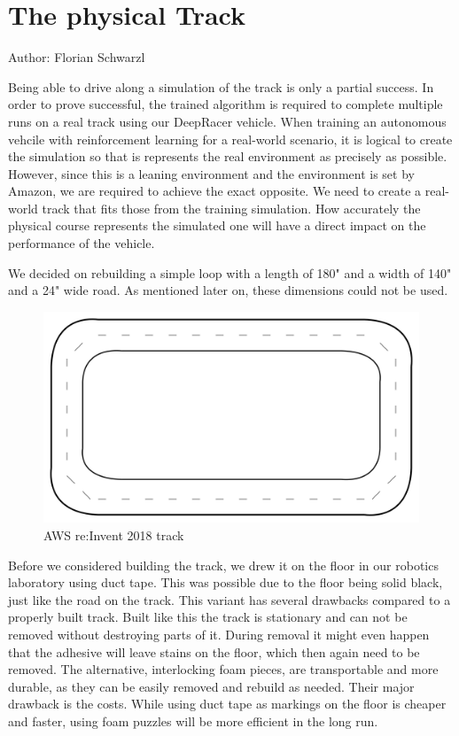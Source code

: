 \chapter{The physical Track}
Author: Florian Schwarzl

Being able to drive along a simulation of the track is only a partial success. In order to prove successful, the trained algorithm is required to complete multiple runs on a real track using our DeepRacer vehicle. When training an autonomous vehcile with reinforcement learning for a real-world scenario, it is logical to create the simulation so that is represents the real environment as precisely as possible. However, since this is a leaning environment and the environment is set by Amazon, we are required to achieve the exact opposite. We need to create a real-world track that fits those from the training simulation. How accurately the physical course represents the simulated one will have a direct impact on the performance of the vehicle.

We decided on rebuilding a simple loop with a length of 180" and a width of 140" and a 24" wide road. As mentioned later on, these dimensions could not be used.

\begin{figure}
    \centering
    \includegraphics[width=.85\textwidth]{images/oval_track.png}
    \caption{AWS re:Invent 2018 track}
    \label{fig:track}
\end{figure}

Before we considered building the track, we drew it on the floor in our robotics laboratory using duct tape. This was possible due to the floor being solid black, just like the road on the track. This variant has several drawbacks compared to a properly built track. Built like this the track is stationary and can not be removed without destroying parts of it. During removal it might even happen that the adhesive will leave stains on the floor, which then again need to be removed. The alternative, interlocking foam pieces, are transportable and more durable, as they can be easily removed and rebuild as needed. Their major drawback is the costs. While using duct tape as markings on the floor is cheaper and faster, using foam puzzles will be more efficient in the long run.

